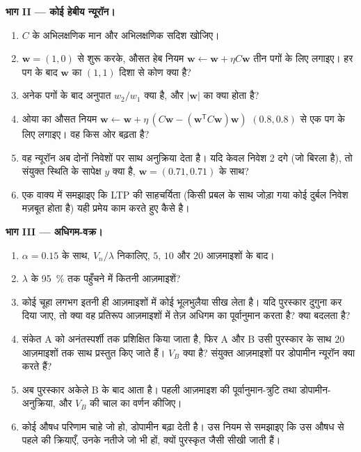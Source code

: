 \begin{problem}
\medskip
\noindent\textbf{भाग II --- कोई हेबीय न्यूरॉन।}
\begin{enumerate}[resume]
  \item $C$ के अभिलक्षणिक मान और अभिलक्षणिक सदिश खोजिए।
  \item $\mathbf{w} = (1, 0)$ से शुरू करके, औसत हेब नियम
        $\mathbf{w} \leftarrow \mathbf{w} + \eta C\mathbf{w}$ तीन पगों
        के लिए लगाइए। हर पग के बाद $\mathbf{w}$ का $(1,1)$ दिशा से
        कोण क्या है?
  \item अनेक पगों के बाद अनुपात $w_{2}/w_{1}$ क्या है, और
        $|\mathbf{w}|$ का क्या होता है?
  \item ओया का औसत नियम $\mathbf{w} \leftarrow \mathbf{w} +
        \eta\,(C\mathbf{w} - (\mathbf{w}^{\mathsf{T}}C\mathbf{w})
        \mathbf{w})$ $(0.8, 0.8)$ से एक पग के लिए लगाइए। वह किस ओर
        बढ़ता है?
  \item वह न्यूरॉन अब दोनों निवेशों पर साथ अनुक्रिया देता है। यदि केवल
        निवेश 2 दगे (जो बिरला है), तो संयुक्त स्थिति के सापेक्ष $y$
        क्या है, $\mathbf{w} = (0.71, 0.71)$ के साथ?
  \item एक वाक्य में समझाइए कि LTP की साहचर्यिता (किसी प्रबल के साथ
        जोड़ा गया कोई दुर्बल निवेश मज़बूत होता है) यही प्रमेय काम करते
        हुए कैसे है।
\end{enumerate}

\medskip
\noindent\textbf{भाग III --- अधिगम-वक्र।}
\begin{enumerate}[resume]
  \item $\alpha = 0.15$ के साथ, $V_{n}/\lambda$ निकालिए, $5$, $10$ और
        $20$ आज़माइशों के बाद।
  \item $\lambda$ के \qty{95}{\%} तक पहुँचने में कितनी आज़माइशें?
  \item कोई चूहा लगभग इतनी ही आज़माइशों में कोई भूलभुलैया सीख लेता है।
        यदि पुरस्कार दुगुना कर दिया जाए, तो क्या वह प्रतिरूप
        आज़माइशों में तेज़ अधिगम का पूर्वानुमान करता है? क्या बदलता है?
  \item संकेत A को अनंतस्पर्शी तक प्रशिक्षित किया जाता है, फिर A और B
        उसी पुरस्कार के साथ $20$ आज़माइशों तक साथ प्रस्तुत किए जाते
        हैं। $V_{B}$ क्या है? संयुक्त आज़माइशों पर डोपामीन न्यूरॉन
        क्या करते हैं?
  \item अब पुरस्कार अकेले B के बाद आता है। पहली आज़माइश की
        पूर्वानुमान-त्रुटि तथा डोपामीन-अनुक्रिया, और $V_{B}$ की चाल का
        वर्णन कीजिए।
  \item कोई औषध परिणाम चाहे जो हो, डोपामीन बढ़ा देती है। उस नियम से
        समझाइए कि उस औषध से पहले की क्रियाएँ, उनके नतीजे जो भी हों,
        क्यों पुरस्कृत जैसी सीखी जाती हैं।
\end{enumerate}


\end{problem}
